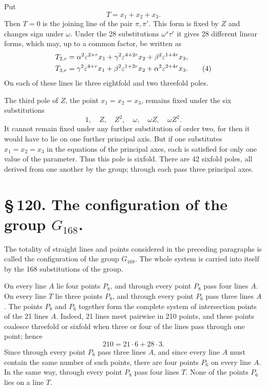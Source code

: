 \documentclass[11pt]{article}
\providecommand{\eps}{\varepsilon}
\providecommand{\eps}{\varepsilon}
\begin{document}
Put
\begin{equation}
T=x_1+x_2+x_3.
\tag{3}
\end{equation}
Then \(T=0\) is the joining line of the pair \(\pi,\pi'\). This form is fixed by \(Z\) and changes sign under \(\omega\). Under the 28 substitutions \(\omega^s\tau^r\) it gives 28 different linear forms, which may, up to a common factor, be written as
\begin{align}
T_{2,r}&=\alpha^2\eps^{2+r}x_1+\gamma^2\eps^{4+2r}x_2+\beta^2\eps^{1+4r}x_3,\notag\\
T_{3,r}&=\gamma^2\eps^{4+r}x_1+\beta^2\eps^{1+2r}x_2+\alpha^2\eps^{2+4r}x_3.
\tag{4}
\end{align}
On each of these lines lie three eightfold and two threefold poles.

The third pole of \(Z\), the point \(x_1=x_2=x_3\), remains fixed under the six substitutions
\begin{equation}
1,\quad Z,\quad Z^2,\quad \omega,\quad \omega Z,\quad \omega Z^2.
\tag{5}
\end{equation}
It cannot remain fixed under any further substitution of order two, for then it would have to lie on one further principal axis. But if one substitutes \(x_1=x_2=x_3\) in the equations of the principal axes, each is satisfied for only one value of the parameter. Thus this pole is sixfold. There are 42 sixfold poles, all derived from one another by the group; through each pass three principal axes.

\section*{\S\,120. The configuration of the group \(G_{168}\).}

The totality of straight lines and points considered in the preceding paragraphs is called the configuration of the group \(G_{168}\). The whole system is carried into itself by the 168 substitutions of the group.

On every line \(A\) lie four points \(P_8\), and through every point \(P_8\) pass four lines \(A\). On every line \(T\) lie three points \(P_8\), and through every point \(P_6\) pass three lines \(A\). The points \(P_8\) and \(P_6\) together form the complete system of intersection points of the 21 lines \(A\). Indeed, 21 lines meet pairwise in 210 points, and these points coalesce threefold or sixfold when three or four of the lines pass through one point; hence
\begin{equation}
210=21\cdot6+28\cdot3.
\tag{1}
\end{equation}
Since through every point \(P_6\) pass three lines \(A\), and since every line \(A\) must contain the same number of such points, there are four points \(P_6\) on every line \(A\). In the same way, through every point \(P_8\) pass four lines \(T\). None of the points \(P_6\) lies on a line \(T\).
\end{document}
